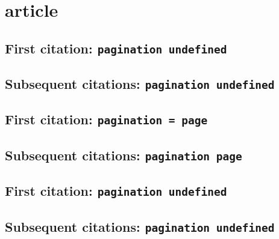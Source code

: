 \documentclass[a4paper]{article}
\begin{document}
\section{article}

\subsection{First citation: \texttt{pagination undefined}}

\cite{leyerle:1993}

\citereset
\cite[161]{leyerle:1993}

\citereset
\cite[note]{leyerle:1993}

\subsection{Subsequent citations: \texttt{pagination undefined}}

\cite{leyerle:1993}

\cite[161]{leyerle:1993}

\cite[note]{leyerle:1993}

\subsection{First citation: \texttt{pagination = page}}

\cite{leyerle:1993:a}

\citereset
\cite[161]{leyerle:1993:a}

\citereset
\cite[note]{leyerle:1993:a}

\subsection{Subsequent citations: \texttt{pagination page}}

\cite{leyerle:1993:a}

\cite[161]{leyerle:1993:a}

\cite[note]{leyerle:1993:a}

\subsection{First citation: \texttt{pagination undefined}}

\cite{wellhausen:1876-1877}

\citereset
\cite[161]{wellhausen:1876-1877}

\citereset
\cite[note]{wellhausen:1876-1877}

\subsection{Subsequent citations: \texttt{pagination undefined}}
\end{document}
